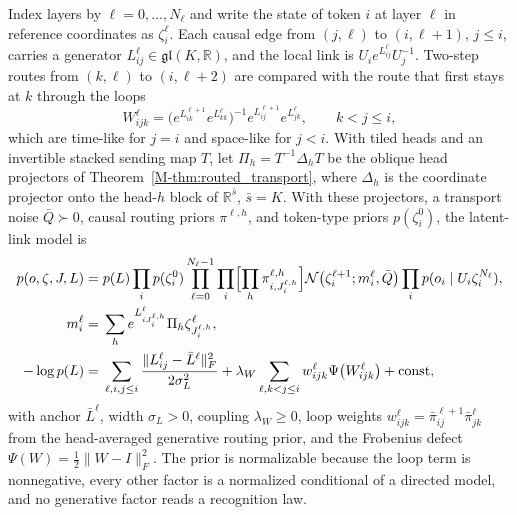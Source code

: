 \documentclass[twoside,11pt]{article}
\begin{document}
Index layers by $\ell=0,\ldots,N_\ell$ and write the state of token $i$ at layer $\ell$ in reference coordinates as $\zeta_i^\ell$. Each causal edge from $(j,\ell)$ to $(i,\ell+1)$, $j\le i$, carries a generator $L_{ij}^\ell\in\mathfrak{gl}(K,\mathbb R)$, and the local link is $U_ie^{L_{ij}^\ell}U_j^{-1}$. Two-step routes from $(k,\ell)$ to $(i,\ell+2)$ are compared with the route that first stays at $k$ through the loops
\begin{equation}
W_{ijk}^\ell=\bigl(e^{L_{ik}^{\ell+1}}e^{L_{kk}^{\ell}}\bigr)^{-1}e^{L_{ij}^{\ell+1}}e^{L_{jk}^{\ell}},\qquad k<j\le i,
\label{eq:lie_depth_loops}
\end{equation}
which are time-like for $j=i$ and space-like for $j<i$. With tiled heads and an invertible stacked sending map $T$, let $\Pi_h=T^{-1}\Delta_hT$ be the oblique head projectors of Theorem~\ref{M-thm:routed_transport}, where $\Delta_h$ is the coordinate projector onto the head-$h$ block of $\mathbb R^{\bar s}$, $\bar s=K$. With these projectors, a transport noise $\bar Q\succ0$, causal routing priors $\pi^{\ell,h}$, and token-type priors $p(\zeta_i^0)$, the latent-link model is
\begin{equation}
\begin{aligned}
p(o,\zeta,J,L)={}&p(L)\prod_ip(\zeta_i^0)\prod_{\ell=0}^{N_\ell-1}\prod_i\Bigl[\prod_h\pi_{i,J_i^{\ell,h}}^{\ell,h}\Bigr]\mathcal N\bigl(\zeta_i^{\ell+1};m_i^\ell,\bar Q\bigr)\prod_ip(o_i\mid U_i\zeta_i^{N_\ell}),\\
m_i^\ell={}&\sum_he^{L_{iJ_i^{\ell,h}}^\ell}\Pi_h\zeta_{J_i^{\ell,h}}^\ell,\\
-\log p(L)={}&\sum_{\ell,i,j\le i}\frac{\|L_{ij}^\ell-\bar L^\ell\|_F^2}{2\sigma_L^2}+\lambda_W\sum_{\ell,k<j\le i}w_{ijk}^\ell\Psi\bigl(W_{ijk}^\ell\bigr)+\mathrm{const},
\end{aligned}
\label{eq:lie_latent_model}
\end{equation}
with anchor $\bar L^\ell$, width $\sigma_L>0$, coupling $\lambda_W\ge0$, loop weights $w_{ijk}^\ell=\bar\pi_{ij}^{\ell+1}\bar\pi_{jk}^\ell$ from the head-averaged generative routing prior, and the Frobenius defect $\Psi(W)=\tfrac12\|W-I\|_F^2$. The prior is normalizable because the loop term is nonnegative, every other factor is a normalized conditional of a directed model, and no generative factor reads a recognition law.
\end{document}
